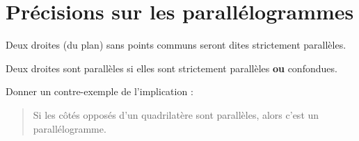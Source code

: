 %	
%	 


\newpage 
{}  
\pagestyle{scrheadings} %
\onehalfspacing   

\section{Précisions sur les parallélogrammes}

\begin{definition} Deux droites (du plan) sans points communs seront dites strictement parallèles.
	
	Deux droites sont parallèles si elles sont strictement parallèles \textbf{ou} confondues.
\end{definition}
\begin{example} Donner un contre-exemple de l'implication :
	\begin{quote}
		Si les côtés opposés d'un quadrilatère sont parallèles, alors c'est un parallélogramme. 
	\end{quote} 
	\vfill 
\end{example}



